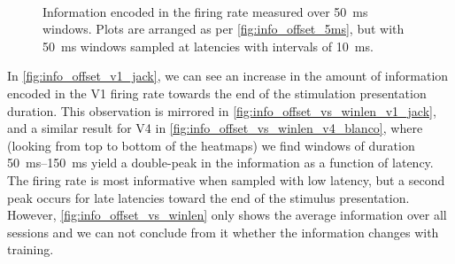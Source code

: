 \begin{figure}[htbp]%
    \centering
    \hspace*{\fill}
    \hspace*{\fill}\hspace{.2cm}\hspace*{\fill}
    \hspace*{\fill}
    \\
    \hspace*{\fill}
    \hspace*{\fill}\hspace{.2cm}\hspace*{\fill}
    \hspace*{\fill}
    \caption{Information encoded in the firing rate measured over \SI{50}{\milli\second} windows.
Plots are arranged as per \autoref{fig:info_offset_5ms}, but with \SI{50}{\milli\second} windows sampled at latencies with intervals of \SI{10}{\milli\second}.
    \label{fig:info_offset}
}
\end{figure}

In \autoref{fig:info_offset_v1_jack}, we can see an increase in the amount of information encoded in the \ac{V1} firing rate towards the end of the stimulation presentation duration.
This observation is mirrored in \autoref{fig:info_offset_vs_winlen_v1_jack}, and a similar result for \ac{V4} in \autoref{fig:info_offset_vs_winlen_v4_blanco}, where (looking from top to bottom of the heatmaps) we find windows of duration \SIrange{50}{150}{\milli\second} yield a double-peak in the information as a function of latency.
The firing rate is most informative when sampled with low latency, but a second peak occurs for late latencies toward the end of the stimulus presentation.
However, \autoref{fig:info_offset_vs_winlen} only shows the average information over all sessions and we can not conclude from it whether the information changes with training.


